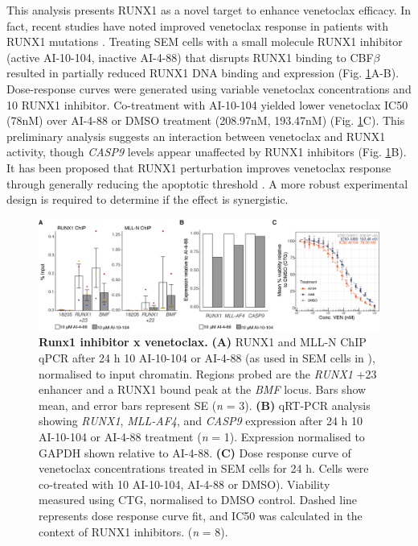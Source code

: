 This analysis presents RUNX1 as a novel target to enhance venetoclax efficacy. In fact, recent studies have noted improved venetoclax response in patients with RUNX1 mutations \citep{cherry_venetoclax_2021, chow_runx1_2021}. Treating SEM cells with a small molecule RUNX1 inhibitor (active AI-10-104, inactive AI-4-88) that disrupts RUNX1 binding to CBF$\beta$ \citep{illendula_small-molecule_2015, illendula_small_2016} resulted in partially reduced RUNX1 DNA binding and expression (Fig. \ref{fig:ch4_runx1-inh}A-B). Dose-response curves were generated using variable venetoclax concentrations and 10 \microm{} RUNX1 inhibitor. Co-treatment with AI-10-104 yielded lower venetoclax IC50 (78nM) over AI-4-88 or DMSO treatment (208.97nM, 193.47nM) (Fig. \ref{fig:ch4_runx1-inh}C). This preliminary analysis suggests an interaction between venetoclax and RUNX1 activity, though \textit{CASP9} levels appear unaffected by RUNX1 inhibitors (Fig. \ref{fig:ch4_runx1-inh}B). It has been proposed that RUNX1 perturbation improves venetoclax response through generally reducing the apoptotic threshold \citep{chow_runx1_2021}. A more robust experimental design is required to determine if the effect is synergistic.

\begin{figure}[ht]
    \centering
    \includegraphics[width=\textwidth,height=\textheight,keepaspectratio]{figures/chapter4/chr4_runx1-inh.png}
    \caption[{Runx1 inhibitor x venetoclax.}]
    {\textbf{Runx1 inhibitor x venetoclax.} 
    \textbf{(A)} RUNX1 and MLL-N ChIP qPCR after 24 h 10 \microm{} AI-10-104 or AI-4-88 (as used in SEM cells in \cite{illendula_small_2016}), normalised to input chromatin. Regions probed are the \textit{RUNX1} +23 enhancer and a RUNX1 bound peak at the \textit{BMF} locus. Bars show mean, and error bars represent SE (\textit{n} = 3).
    \textbf{(B)} qRT-PCR analysis showing \textit{RUNX1}, \textit{MLL-AF4}, and \textit{CASP9} expression after 24 h 10 \microm{} AI-10-104 or AI-4-88 treatment (\textit{n} = 1). Expression normalised to GAPDH shown relative to AI-4-88.
    \textbf{(C)} Dose response curve of venetoclax concentrations treated in SEM cells for 24 h. Cells were co-treated with 10 \microm{} AI-10-104, AI-4-88 or DMSO). Viability measured using CTG, normalised to DMSO control. Dashed line represents dose response curve fit, and IC50 was calculated in the context of RUNX1 inhibitors. (\textit{n} = 8). 
    }
    \label{fig:ch4_runx1-inh}
\end{figure}